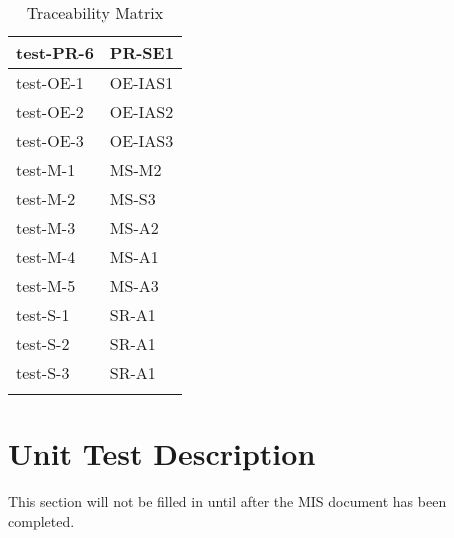 \documentclass[12pt, titlepage]{article}
\begin{document}
\begin{center}
\begin{longtable}{|>{\centering\arraybackslash}p{4cm}|>{\centering\arraybackslash}p{10cm}|}
  \hline
  test-PR-6 & PR-SE1 \\
  \hline
  test-OE-1 & OE-IAS1 \\
  \hline
  test-OE-2 & OE-IAS2 \\
  \hline
  test-OE-3 & OE-IAS3 \\
  \hline
  test-M-1 & MS-M2 \\
  \hline
  test-M-2 & MS-S3 \\
  \hline
  test-M-3 & MS-A2 \\
  \hline
  test-M-4 & MS-A1 \\
  \hline
  test-M-5 & MS-A3 \\
  \hline
  test-S-1 & SR-A1 \\
  \hline
  test-S-2 & SR-A1 \\
  \hline
  test-S-3 & SR-A1 \\
  \hline

  \caption{Traceability Matrix}
  \end{longtable}
  \end{center}


\section{Unit Test Description}
This section will not be filled in until after the MIS document has been completed.



\end{document}
